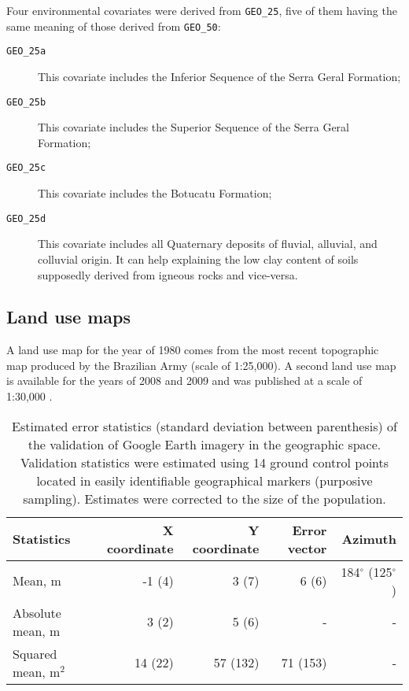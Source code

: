 Four environmental covariates were derived from \texttt{GEO\_25}, five of them having the same meaning of those derived from \texttt{GEO\_50}:

\begin{description}
  \item[\texttt{GEO\_25a}] This covariate includes the Inferior Sequence of the Serra Geral Formation;
 
  \item[\texttt{GEO\_25b}] This covariate includes the Superior Sequence of the Serra Geral Formation;
 
  \item[\texttt{GEO\_25c}] This covariate includes the Botucatu Formation;
 
  \item[\texttt{GEO\_25d}] This covariate includes all Quaternary deposits of fluvial, alluvial, and colluvial origin. It can help explaining the low clay content of soils supposedly derived from igneous rocks and vice-versa.
\end{description}

\tocless\subsection{Land use maps}\label{sec:land}

A land use map for the year of 1980 comes from the most recent topographic map produced by the Brazilian Army (scale of 1:25,000). A second land use map is available for the years of 2008 and 2009 and was published at a scale of 1:30,000 \citep{SamuelRosaEtAl2011a}.

\begin{table}[ht]
\caption{Estimated error statistics (standard deviation between parenthesis) of the validation of Google Earth imagery in the geographic space. Validation statistics were estimated using 14 ground control points located in easily identifiable geographical markers (purposive sampling). Estimates were corrected to the size of the population.}
\label{tab:google-geo-val}
\centering
{\small
\begin{tabular}{lrrrr}
\hline
Statistics           & X coordinate & Y coordinate & Error vector  & Azimuth                   \\
\hline
Mean, m              & -1 (4)       & 3  (7)       & 6  (6)        & 184$^\circ$ (125$^\circ$) \\ 
Absolute mean, m     & 3  (2)       & 5  (6)       & -             & -                         \\ 
Squared mean, m$^2$  & 14 (22)      & 57 (132)     & 71 (153)      & -                         \\ 
\hline
\end{tabular}}
\end{table}

